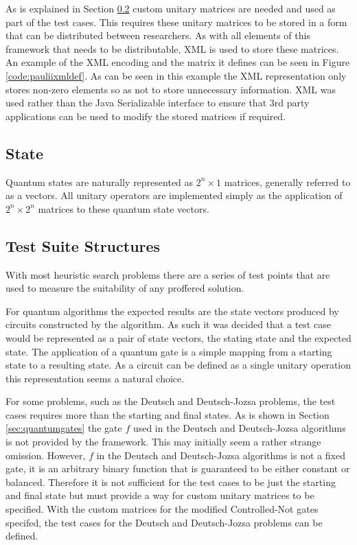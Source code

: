 As is explained in Section \ref{sec:testsuitestruc} custom unitary matrices are needed and used as part of the test cases.
This requires these unitary matrices to be stored in a form that can be distributed between researchers.
As with all elements of this framework that needs to be distributable, XML is used to store these matrices.
An example of the XML encoding and the matrix it defines can be seen in Figure \ref{code:pauliixmldef}.
As can be seen in this example the XML representation only stores non-zero elements so as not to store unnecessary information.
XML was used rather than the Java Serializable interface to ensure that 3rd party applications can be used to modify the stored matrices if required.

\subsection{State}
Quantum states are naturally represented as $2^n\times1$ matrices, generally referred to as a vectors.
All unitary operators are implemented simply as the application of $2^n\times2^n$ matrices to these quantum state vectors.

\subsection{Test Suite Structures}
\label{sec:testsuitestruc}
With most heuristic search problems there are a series of test points that are used to measure the suitability of any proffered solution.

For quantum algorithms the expected results are the state vectors produced by circuits constructed by the algorithm.
As such it was decided that a test case would be represented as a pair of state vectors, the stating state and the expected state.
The application of a quantum gate is a simple mapping from a starting state to a resulting state.
As a circuit can be defined as a single unitary operation this representation seems a natural choice.

For some problems, such as the Deutsch and Deutsch-Jozsa problems, the test cases requires more than the starting and final states.
As is shown in Section \ref{sec:quantumgates} the gate $f$ used in the Deutsch and Deutsch-Jozsa algorithms is not provided by the framework.
This may initially seem a rather strange omission.
However, $f$ in the Deutsch and Deutsch-Jozsa algorithms is not a fixed gate, it is an arbitrary binary function that is guaranteed to be either constant or balanced.
Therefore it is not sufficient for the test cases to be just the starting and final state but must provide a way for custom unitary matrices to be specified.
With the custom matrices for the modified Controlled-Not gates specifed, the test cases for the Deutsch and Deutsch-Jozsa problems can be defined.


